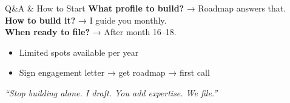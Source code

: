 \documentclass[aspectratio=169, 10pt]{beamer}
\begin{document}
	\begin{frame}{Q\&A \& How to Start}
		\centering
		\textbf{\Large What profile to build?} → Roadmap answers that. \\
		\textbf{\Large How to build it?} → I guide you monthly. \\
		\textbf{\Large When ready to file?} → After month 16–18.
		
		\vspace{0.5cm}
		\begin{itemize}
			\item Limited spots available per year
			\item Sign engagement letter → get roadmap → first call
		\end{itemize}
		
		\vspace{0.3cm}
		\textit{“Stop building alone. I draft. You add expertise. We file.”}
	\end{frame}
	
\end{document}
